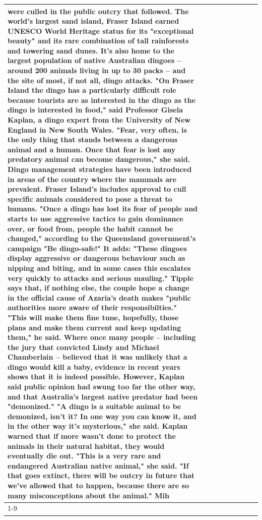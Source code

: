 \begin{table}[H]
\begin{tabular}{lllrlllll}
were culled in the public outcry that followed. The world's largest sand island, Fraser Island earned UNESCO World Heritage status for its "exceptional beauty" and its rare combination of tall rainforests and towering sand dunes. It's also home to the largest population of native Australian dingoes -- around 200 animals living in up to 30 packs -- and the site of most, if not all, dingo attacks. "On Fraser Island the dingo has a particularly difficult role because tourists are as interested in the dingo as the dingo is interested in food," said Professor Gisela Kaplan, a dingo expert from the University of New England in New South Wales. "Fear, very often, is the only thing that stands between a dangerous animal and a human. Once that fear is lost any predatory animal can become dangerous," she said. Dingo management strategies have been introduced in areas of the country where the mammals are prevalent. Fraser Island's includes approval to cull specific animals considered to pose a threat to humans. "Once a dingo has lost its fear of people and starts to use aggressive tactics to gain dominance over, or food from, people the habit cannot be changed," according to the Queensland government's campaign "Be dingo-safe!" It adds: "These dingoes display aggressive or dangerous behaviour such as nipping and biting, and in some cases this escalates very quickly to attacks and serious mauling." Tipple says that, if nothing else, the couple hope a change in the official cause of Azaria's death makes "public authorities more aware of their responsibilties." "This will make them fine tune, hopefully, those plans and make them current and keep updating them," he said. Where once many people -- including the jury that convicted Lindy and Michael Chamberlain -- believed that it was unlikely that a dingo would kill a baby, evidence in recent years shows that it is indeed possible. However, Kaplan said public opinion had swung too far the other way, and that Australia's largest native predator had been "demonized." "A dingo is a suitable animal to be demonized, isn't it? In one way you can know it, and in the other way it's mysterious," she said. Kaplan warned that if more wasn't done to protect the animals in their natural habitat, they would eventually die out. "This is a very rare and endangered Australian native animal," she said. "If that goes extinct, there will be outcry in future that we've allowed that to happen, because there are so many misconceptions about the animal." Mih \\
\cline{1-9}

\end{tabular}
\end{table}
